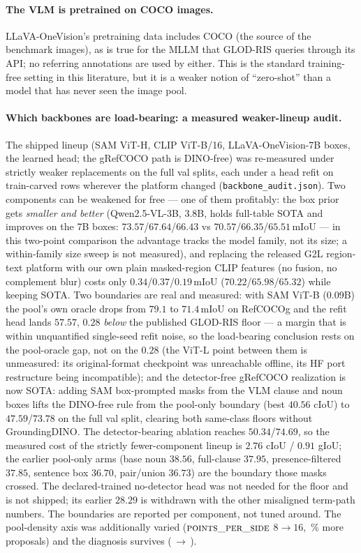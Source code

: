 \paragraph{The VLM is pretrained on COCO images.}
LLaVA-OneVision's pretraining data includes COCO (the source of the
benchmark images), as is true for the MLLM that GLOD-RIS queries through its
API; no referring annotations are used by either. This is the standard
training-free setting in this literature, but it is a weaker notion of
``zero-shot'' than a model that has never seen the image pool.

\paragraph{Which backbones are load-bearing: a measured weaker-lineup audit.}
The shipped lineup (SAM ViT-H, CLIP ViT-B/16, LLaVA-OneVision-7B boxes, the
learned head; the gRefCOCO path is DINO-free) was re-measured
under strictly weaker replacements on the full val splits, each under a head
refit on train-carved rows wherever the platform changed
(\texttt{backbone\_audit.json}). Two components can be weakened for free ---
one of them profitably: the box prior gets \emph{smaller and better}
(Qwen2.5-VL-3B, 3.8B, holds full-table SOTA and improves on the 7B boxes:
$73.57$/$67.64$/$66.43$ vs $70.57$/$66.35$/$65.51$\,mIoU --- in this
two-point comparison the advantage tracks the model family, not its size;
a within-family size sweep is not measured), and replacing the released
G2L region-text platform with our own plain masked-region CLIP features (no
fusion, no complement blur) costs only
$0.34$/$0.37$/$0.19$\,mIoU ($70.22$/$65.98$/$65.32$) while keeping SOTA. Two
boundaries are real and measured: with SAM ViT-B (0.09B) the pool's own oracle
drops from $79.1$ to $71.4$\,mIoU on RefCOCOg and the refit head lands
$57.57$, $0.28$ \emph{below} the published GLOD-RIS floor --- a margin that
is within unquantified single-seed refit noise, so the load-bearing
conclusion rests on the pool-oracle gap, not on the $0.28$ (the ViT-L point
between them is unmeasured: its original-format checkpoint was unreachable
offline, its HF port restructure being incompatible); and the detector-free gRefCOCO
realization is now SOTA: adding SAM box-prompted masks from the VLM clause
and noun boxes lifts the DINO-free rule from the pool-only boundary (best
$40.56$ cIoU) to $47.59$/$73.78$ on the full val split, clearing both
same-class floors without GroundingDINO. The detector-bearing ablation reaches
$50.34$/$74.69$, so the measured cost of the strictly fewer-component lineup
is $2.76$ cIoU / $0.91$ gIoU; the earlier pool-only arms (base noun $38.56$,
full-clause $37.95$, presence-filtered $37.85$, sentence box $36.70$,
pair/union $36.73$) are the boundary those masks crossed. The declared-trained
no-detector head was not needed for the floor and is not shipped; its earlier
$28.29$ is withdrawn with the other misaligned term-path numbers.
The boundaries are reported per component, not tuned around. The pool-density
axis was additionally varied
($\textsc{points\_per\_side}$ $8\to16$, \ppsProposalDelta\,\% more proposals)
and the diagnosis survives
(\ppsWiEight\,$\to$\,\ppsWiSixteen).

